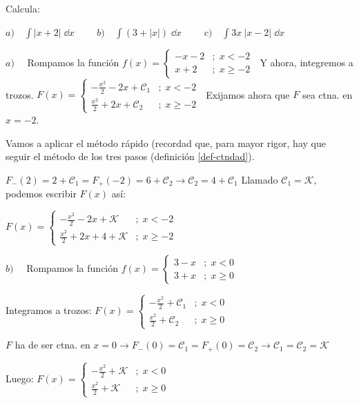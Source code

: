 \begin{ejre} Calcula:
	
		 $a) \quad \displaystyle \int |x+2| \; \dd x \qquad$
		 $b) \quad \displaystyle \int (3+|x|) \; \dd x \qquad$
		 $c) \quad \displaystyle \int 3x\: |x-2| \; \dd x $
	
\end{ejre}
\begin{proofw}\renewcommand{\qedsymbol}{$\diamond$}


$a) \quad$ Rompamos la función $f(x)=\begin{cases}
								-x-2 &; \; x<-2 \\
								x+2  &; \; x\ge -2
								\end{cases}\; $ Y ahora, integremos a trozos.
	$F(x)=\begin{cases}
			-\frac {x^2}{2}-2x+\mathcal {C}_1 &; \; x<-2 \\
			\frac {x^2}{2}+2x+\mathcal {C}_2  &; \; x\ge -2
			\end{cases}\; $ Exijamos ahora que $F$ sea ctna. en $x=-2$.
			
	Vamos a aplicar el método rápido (recordad que, para mayor rigor, hay que seguir el método de los tres pasos (definición \ref{def-ctndad}).
	
	$F_-(2)=2+\mathcal {C}_1=F_+(-2)=6+\mathcal {C}_2 \to \mathcal {C}_2=4+\mathcal {C}_1$ Llamado $\mathcal {C}_1=\mathcal {K}$, podemos escribir $F(x)$ así:
	
	$F(x)=\begin{cases}
			-\frac {x^2}{2}-2x+ \mathcal {K} &; \; x<-2 \\
			\frac {x^2}{2}+2x+4+\mathcal {K}  &; \; x\ge -2
			\end{cases}\; $

$b) \quad$ Rompamos la función $f(x)=\begin{cases}
								3-x  &; \;  x<0 \\
								3+x  &; \;  x\ge 0
								\end{cases} \;$ 


Integramos a trozos: $F(x)=\begin{cases}
						-\frac {x^2}{2}+\mathcal{C}_1 &; \; x<0 \\
						\frac {x^2}{2}+\mathcal{C}_2 &; \; x\ge 0
								\end{cases}$
								
$F$ ha de ser ctna. en $x=0 \to F_-(0)=\mathcal {C}_1=F_+(0)=\mathcal {C}_2 \to \mathcal {C}_1=\mathcal {C}_2=\mathcal {K}$

Luego: $F(x)=\begin{cases}
			-\frac {x^2}{2}+\mathcal{K}&; \; x<0 \\
			\frac {x^2}{2}+\mathcal{K} &; \; x\ge 0
			\end{cases}$
			

\end{proofw}
